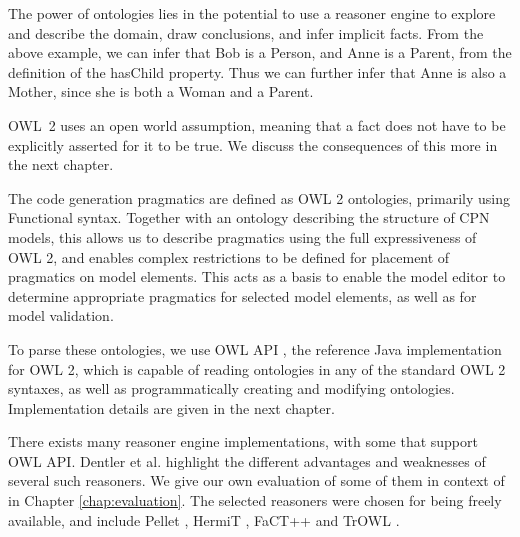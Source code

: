 The power of ontologies lies in the potential to use a reasoner engine to
explore and describe the domain, draw conclusions, and infer implicit facts.
From the above example, we can infer that Bob is a Person, and Anne is a Parent,
from the definition of the hasChild property. Thus we can further infer that
Anne is also a Mother, since she is both a Woman and a Parent.

OWL~2 uses an open world assumption, meaning that a fact does not have to be
explicitly asserted for it to be true. We discuss the consequences of this more
in the next chapter.

The code generation pragmatics are defined as OWL 2 ontologies, primarily using
Functional syntax. Together with an ontology describing the structure of CPN
models, this allows us to describe pragmatics using the full expressiveness of
OWL 2, and enables complex restrictions to be defined for placement of
pragmatics on model elements. This acts as a basis to enable the \thename{}
model editor to determine appropriate pragmatics for selected model elements, as
well as for model validation. 

To parse these ontologies, we use OWL API \cite{horridge2009owl}, the reference Java
implementation for OWL 2, which is capable of reading ontologies in any of the
standard OWL 2 syntaxes, as well as programmatically creating and modifying
ontologies.
Implementation details are given in the next chapter.

There exists many reasoner engine implementations, with some that support OWL
API. Dentler et al. \cite{dentler2011comparison} highlight the different
advantages and weaknesses of several such reasoners.
We give our own evaluation of some of them in context of \thename{} in Chapter
\ref{chap:evaluation}. The selected reasoners were chosen for being freely
available, and include Pellet \cite{sirin2007pellet}, HermiT
\cite{shearer2008hermit}, FaCT++ \cite{tsarkov2006fact++} and TrOWL
\cite{TPR2010}.

